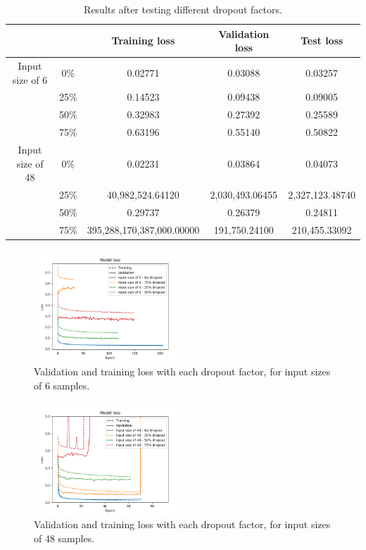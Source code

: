 \documentclass[]{article}
\begin{document}
\begin{table}[H]
	\centering
	\begin{tabular}{@{}ccccc@{}}
		\toprule
		&      & Training loss             & Validation loss & Test loss       \\ \midrule
		Input size of 6  & 0\%  & 0.02771                   & 0.03088         & 0.03257         \\
		& 25\% & 0.14523                   & 0.09438         & 0.09005         \\
		& 50\% & 0.32983                   & 0.27392         & 0.25589         \\
		& 75\% & 0.63196                   & 0.55140         & 0.50822         \\
		\midrule
		Input size of 48 & 0\%  & 0.02231                   & 0.03864         & 0.04073         \\
		& 25\% & 40,982,524.64120          & 2,030,493.06455 & 2,327,123.48740 \\
		& 50\% & 0.29737                   & 0.26379         & 0.24811         \\
		& 75\% & 395,288,170,387,000.00000 & 191,750.24100   & 210,455.33092   \\ \bottomrule
	\end{tabular}
	\caption{Results after testing different dropout factors.}
	\label{t:drop1}
\end{table}

\begin{figure}[H]
	\centering
	\includegraphics[width=0.5\textwidth]{drop11}
	\caption{Validation and training loss with each dropout factor, for input sizes of 6 samples.}
	\label{f:drop11}
\end{figure}

\begin{figure}[H]
	\centering
	\includegraphics[width=0.5\textwidth]{drop12}
	\caption{Validation and training loss with each dropout factor, for input sizes of 48 samples.}
	\label{f:drop12}
\end{figure}
\end{document}
